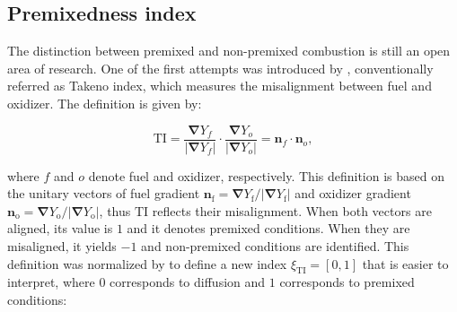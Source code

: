 \documentclass[preprint,12pt,authoryear]{elsarticle}
\begin{document}




\subsection{Premixedness index}
\label{subsec:premixedness_index}

The distinction between premixed and non-premixed combustion is still an open area of research. One of the first attempts was introduced by \cite{yamashita_numerical_1996}, conventionally referred as Takeno index, which measures the misalignment between fuel and oxidizer. The definition is given by:

 \begin{equation}
\mathrm{TI} = \frac{\bm{\nabla} Y_f }{|\bm{\nabla} Y_f| } \cdot  \frac{  \bm{\nabla} Y_o}{ |\bm{\nabla} Y_o|} = \bm{n}_f \cdot \bm{n}_o,
\end{equation}

where $f$ and $o$ denote fuel and oxidizer, respectively.  This definition is based on the unitary vectors of fuel gradient $\bm{n}_\mathrm{f} =   \bm{\nabla} Y_\mathrm{f} / |\bm{\nabla} Y_\mathrm{f}|$  and oxidizer gradient $\bm{n}_\mathrm{o} =   \bm{\nabla} Y_\mathrm{o} / |\bm{\nabla} Y_\mathrm{o}|$, thus $\mathrm{TI}$ reflects their misalignment. When both vectors are aligned, its value is $1$ and it denotes premixed conditions. When they are misaligned, it yields $-1$ and non-premixed conditions are identified. This definition was normalized by \cite{domingo_partially_2002} to define a new index $\xi_\mathrm{TI}=[0,1]$ that is easier to interpret, where $0$ corresponds to diffusion and $1$ corresponds to premixed conditions:
\end{document}
